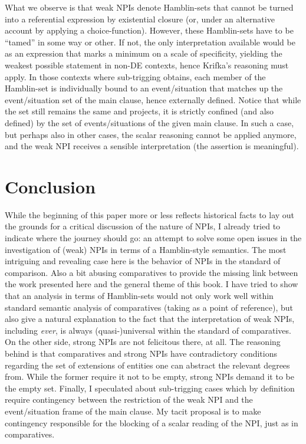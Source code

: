 \documentclass[output=paper,colorlinks,citecolor=brown,
]{langscibook}
\begin{document}
What we observe is that weak NPIs denote Hamblin-sets that cannot be turned into a
referential expression by existential closure (or, under an alternative account by applying a choice-function).
However, these Hamblin-sets have to be “tamed” in some way or other. If not, the only interpretation available would be
as an expression that marks a minimum on a scale of specificity, yielding the weakest possible statement in non-DE
contexts, hence Krifka's reasoning must apply. In those contexts where sub-trigging obtains, each member of the
Hamblin-set is individually bound to an event/situation that matches up the event/situation set of the main clause,
hence externally defined. Notice that while the set still remains the same and projects, it is strictly confined (and
also defined) by the set of events/situations of the given main clause. In such a case, but perhaps also in other
cases, the scalar reasoning cannot be applied anymore, and the weak NPI receives a sensible interpretation (the
assertion is meaningful).

\section{Conclusion}

While the beginning of this paper more or less reflects historical facts to lay out the grounds for a critical discussion of the nature of NPIs,
I already tried to indicate where the journey should go: an attempt to solve some open issues in the investigation of
(weak) NPIs in terms of a Hamblin-style semantics. The most intriguing and revealing case here is the behavior of NPIs
in the standard of comparison. Also a bit abusing comparatives to provide the missing link between the work presented
here and the general theme of this book. I have tried to show that an analysis in terms of Hamblin-sets would not only work
well within standard semantic analysis of comparatives (taking \citet{stechow1984} as a point of reference), but
also give a natural explanation to the fact that the interpretation of weak NPIs, including \textit{ever}, is always
(quasi-)universal within the standard of comparatives. On the other side, strong NPIs are not felicitous there, at all.
The reasoning behind is that comparatives and strong NPIs have contradictory conditions regarding the set
of extensions of entities one can abstract the relevant degrees from. While the former require it not to be empty,
strong NPIs demand it to be the empty set. Finally, I speculated about sub-trigging cases which by definition require
contingency between the restriction of the weak NPI and the event/situation frame of the main clause. My tacit proposal
is to make contingency responsible for the blocking of a scalar reading of the NPI, just as in comparatives.
\end{document}
